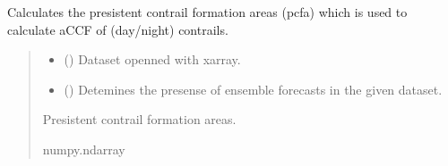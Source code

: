 \documentclass[a4paper,11pt,english]{sphinxmanual}
\begin{document}

\begin{fulllineitems}
\label{\detokenize{modules:envlib.contrail.get_pcfa}}
\pysigstartsignatures
{}
\pysigstopsignatures
\sphinxAtStartPar
Calculates the presistent contrail formation areas (pcfa) which is used to calculate aCCF of (day/night) contrails.
\begin{quote}\begin{description}
\begin{itemize}
\item {} 
\sphinxAtStartPar
{} () \textendash{} Dataset openned with xarray.

\item {} 
\sphinxAtStartPar
{} () \textendash{} Detemines the presense of ensemble forecasts in the given dataset.

\end{itemize}

\sphinxAtStartPar
Presistent contrail formation areas.

\sphinxAtStartPar
numpy.ndarray

\end{description}\end{quote}

\end{fulllineitems}

\end{document}
